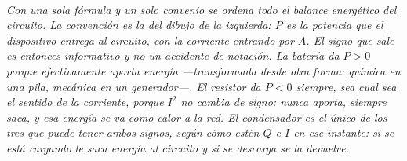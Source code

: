 \begin{center}
\\[0.5em]
{\small\itshape Con una sola fórmula y un solo convenio se ordena todo el
balance energético del circuito. La convención es la del dibujo de la izquierda:
$P$ es la potencia que el dispositivo \emph{entrega} al circuito, con la
corriente entrando por $A$. El signo que sale es entonces informativo y no un
accidente de notación. La batería da $P>0$ porque efectivamente aporta energía
---transformada desde otra forma: química en una pila, mecánica en un
generador---. El resistor da $P<0$ siempre, sea cual sea el sentido de la
corriente, porque $I^2$ no cambia de signo: nunca aporta, siempre saca, y esa
energía se va como calor a la red. El condensador es el único de los tres que
puede tener ambos signos, según cómo estén $Q$ e $I$ en ese instante: si se está
cargando le saca energía al circuito y si se descarga se la devuelve.}
\end{center}

